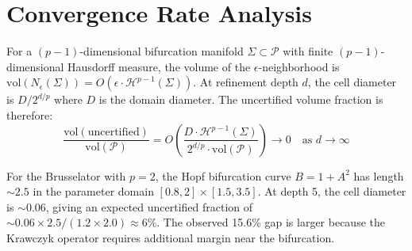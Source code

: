\documentclass[11pt]{article}
\begin{document}
\section{Convergence Rate Analysis}
\label{app:convergence}

For a $(p{-}1)$-dimensional bifurcation manifold $\Sigma \subset \mathcal{P}$ with finite $(p{-}1)$-dimensional Hausdorff measure, the volume of the $\epsilon$-neighborhood is $\mathrm{vol}(N_\epsilon(\Sigma)) = O(\epsilon \cdot \mathcal{H}^{p-1}(\Sigma))$.
At refinement depth $d$, the cell diameter is $D/2^{d/p}$ where $D$ is the domain diameter.
The uncertified volume fraction is therefore:
\[
\frac{\mathrm{vol}(\text{uncertified})}{\mathrm{vol}(\mathcal{P})} = O\!\left(\frac{D \cdot \mathcal{H}^{p-1}(\Sigma)}{2^{d/p} \cdot \mathrm{vol}(\mathcal{P})}\right) \to 0 \quad \text{as } d \to \infty
\]

For the Brusselator with $p=2$, the Hopf bifurcation curve $B = 1 + A^2$ has length $\sim 2.5$ in the parameter domain $[0.8, 2] \times [1.5, 3.5]$.
At depth 5, the cell diameter is $\sim 0.06$, giving an expected uncertified fraction of $\sim 0.06 \times 2.5 / (1.2 \times 2.0) \approx 6\%$.
The observed 15.6\% gap is larger because the Krawczyk operator requires additional margin near the bifurcation.
\end{document}
